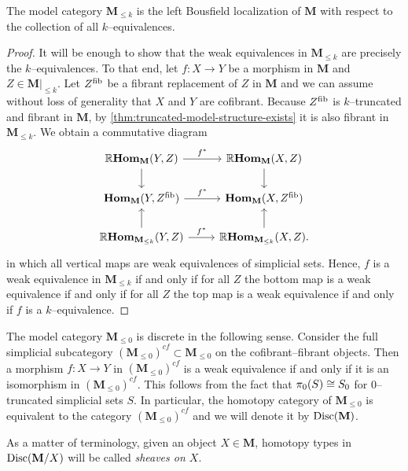 \begin{corollary}\label{cor:weak-equiv-level}
  The model category \(\mathbf M_{\leq k}\) is the left Bousfield localization of \(\mathbf M\) with respect to the collection of all \(k\)--equivalences.
\end{corollary}
\begin{proof}
  It will be enough to show that the weak equivalences in \(\mathbf M_{\leq k}\) are precisely the \(k\)--equivalences. To that end, let \(f\colon X\to Y\) be a morphism in \(\mathbf M\) and \(Z\in\mathbf M|_{\leq k}\). Let \(Z^{\operatorname{\textnormal{fib}}}\) be a fibrant replacement of \(Z\) in \(\mathbf M\) and we can assume without loss of generality that \(X\) and \(Y\) are cofibrant. Because \(Z^{\operatorname{\textnormal{fib}}}\) is \(k\)--truncated and fibrant in \(\mathbf M\), by \autoref{thm:truncated-model-structure-exists} it is also fibrant in \(\mathbf M_{\leq k}\). We obtain a commutative diagram
  \[
  \begin{tikzcd}
    \RHom_{\mathbf M}(Y, Z) \arrow[r, "f^{*}"] \arrow[d] & \RHom_{\mathbf M}(X, Z) \arrow[d] \\
    \Hom_{\mathbf M}(Y, Z^{\fib}) \arrow[r, "f^{*}"] & \Hom_{\mathbf M}(X, Z^{\fib}) \\
    \RHom_{\mathbf M_{\leq k}}(Y, Z) \arrow[r, "f^{*}"] \arrow[u] & \RHom_{\mathbf M_{\leq k}}(X, Z). \arrow[u]
  \end{tikzcd}
  \]
  in which all vertical maps are weak equivalences of simplicial sets. Hence, \(f\) is a weak equivalence in \(\mathbf M_{\leq k}\) if and only if for all \(Z\) the bottom map is a weak equivalence if and only if for all \(Z\) the top map is a weak equivalence if and only if \(f\) is a \(k\)--equivalence.
\end{proof}

\begin{remark}
  The model category \(\mathbf M_{\leq 0}\) is discrete in the following sense. Consider the full simplicial subcategory \((\mathbf M_{\leq 0})^{cf}\subset \mathbf M_{\leq 0}\) on the cofibrant--fibrant objects. Then a morphism \(f\colon X\to Y\) in \((\mathbf M_{\leq 0})^{cf}\) is a weak equivalence if and only if it is an isomorphism in \((\mathbf M_{\leq 0})^{cf}\). This follows from the fact that \(\pi_{0}(S) \cong S_{0}\) for \(0\)--truncated simplicial sets \(S\). In particular, the homotopy category of \(\mathbf M_{\leq 0}\) is equivalent to the category \((\mathbf M_{\leq 0})^{cf}\) and we will denote it by \(\operatorname{\textnormal{Disc}}(\mathbf M)\).

  As a matter of terminology, given an object \(X\in\mathbf M\), homotopy types in \(\operatorname{\textnormal{Disc}}(\mathbf M/X)\) will be called \emph{sheaves on \(X\)}.
\end{remark}


